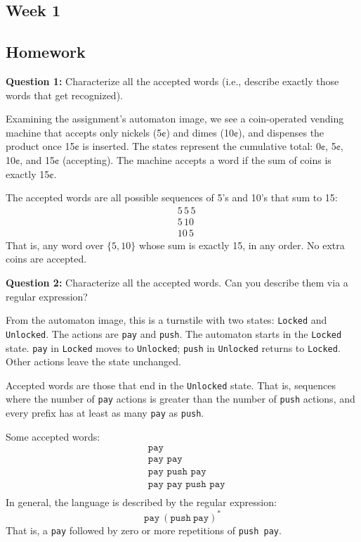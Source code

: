 \documentclass{article}
\theoremstyle{theorem}
\theoremstyle{definition}
\theoremstyle{remark}
\begin{document}
\subsection{Week 1}
\smallskip

\subsection*{Homework}

\textbf{Question 1:} Characterize all the accepted words (i.e., describe exactly those words that get recognized).
\smallskip

Examining the assignment's automaton image, we see a coin-operated vending machine that accepts only nickels (5¢) and dimes (10¢), and dispenses the product once 15¢ is inserted. The states represent the cumulative total: 0¢, 5¢, 10¢, and 15¢ (accepting). The machine accepts a word if the sum of coins is exactly 15¢.

The accepted words are all possible sequences of 5's and 10's that sum to 15:
\[
\begin{aligned}
    &5\,5\,5 \\
    &5\,10 \\
    &10\,5
\end{aligned}
\]
That is, any word over \(\{5, 10\}\) whose sum is exactly 15, in any order. No extra coins are accepted.

\bigskip

\textbf{Question 2:} Characterize all the accepted words. Can you describe them via a regular expression?

From the automaton image, this is a turnstile with two states: \texttt{Locked} and \texttt{Unlocked}. The actions are \texttt{pay} and \texttt{push}. The automaton starts in the \texttt{Locked} state. \texttt{pay} in \texttt{Locked} moves to \texttt{Unlocked}; \texttt{push} in \texttt{Unlocked} returns to \texttt{Locked}. Other actions leave the state unchanged.

Accepted words are those that end in the \texttt{Unlocked} state. That is, sequences where the number of \texttt{pay} actions is greater than the number of \texttt{push} actions, and every prefix has at least as many \texttt{pay} as \texttt{push}.

Some accepted words:
\[
\begin{aligned}
    &\texttt{pay} \\
    &\texttt{pay\ pay} \\
    &\texttt{pay\ push\ pay} \\
    &\texttt{pay\ pay\ push\ pay} \\
\end{aligned}
\]
In general, the language is described by the regular expression:
\[
\texttt{pay}\ (\texttt{push}\ \texttt{pay})^*
\]
That is, a \texttt{pay} followed by zero or more repetitions of \texttt{push pay}.
\end{document}
